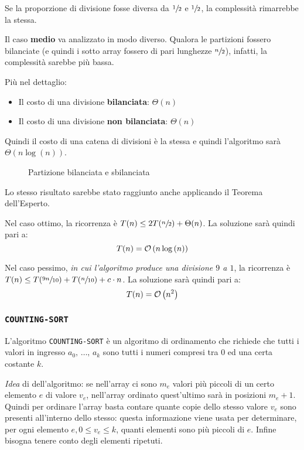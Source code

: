 \documentclass[italian, 10pt]{article}
\begin{document}
Se la proporzione di divisione fosse diversa da \(\sfrac{1}{2}\) e \(\sfrac{1}{2}\), la complessità rimarrebbe la stessa.

\bigskip
Il caso \textbf{medio} va analizzato in modo diverso.
Qualora le partizioni fossero bilanciate (e quindi i sotto array fossero di pari lunghezze \(\sfrac{n}{2}\)), infatti, la complessità sarebbe più bassa.

Più nel dettaglio:

\begin{itemize}
  \item Il costo di una divisione \textbf{bilanciata}: \(\Theta(n)\)
  \item Il costo di una divisione \textbf{non bilanciata}: \(\Theta(n)\)
\end{itemize}

Quindi il costo di una catena di divisioni è la stessa e quindi l'algoritmo sarà \(\Theta(n \log{(n)})\).

\begin{figure}[htbp]
  \bigskip
  \centering
  \caption{Partizione bilanciata e sbilanciata}
  \label{fig:partizione-bilanciata-sbilanciata}
  \bigskip
\end{figure}

\bigskip
Lo stesso risultato sarebbe stato raggiunto anche applicando il Teorema dell'Esperto.

Nel caso ottimo, la ricorrenza è \(T(n) \leq 2T(\sfrac{n}{2}) + \Theta(n)\).
La soluzione sarà quindi pari a: \[ T(n) = \mathcal{O}\left(n \log{(n)}\right) \]

Nel caso pessimo, \textit{in cui l'algoritmo produce una divisione \(9\) a \(1\)}, la ricorrenza è \(T(n) \leq T(\sfrac{9n}{10}) + T(\sfrac{n}{10}) + c \cdot n\).
La soluzione sarà quindi pari a: \[ T(n) = \mathcal{O}\left(n^2\right) \]


\subsubsection{\texttt{COUNTING-SORT}}

L'algoritmo \texttt{COUNTING-SORT} è un algoritmo di ordinamento che richiede che tutti i valori in ingresso \(a_0,\, \ldots,\, a_k\) sono tutti i numeri compresi tra \(0\) ed una certa costante \(k\).

\textit{Idea} di dell'algoritmo:
se nell'array ci sono \(m_e\) valori più piccoli di un certo elemento \(e\) di valore \(v_e\), nell'array ordinato quest'ultimo sarà in posizioni \(m_e + 1\).
Quindi per ordinare l'array basta contare quante copie dello stesso valore \(v_e\) sono presenti all'interno dello stesso: questa informazione viene usata per determinare, per ogni elemento \(e, 0 \leq v_e \leq k\), quanti elementi sono più piccoli di \(e\).
Infine bisogna tenere conto degli elementi ripetuti.
\end{document}
